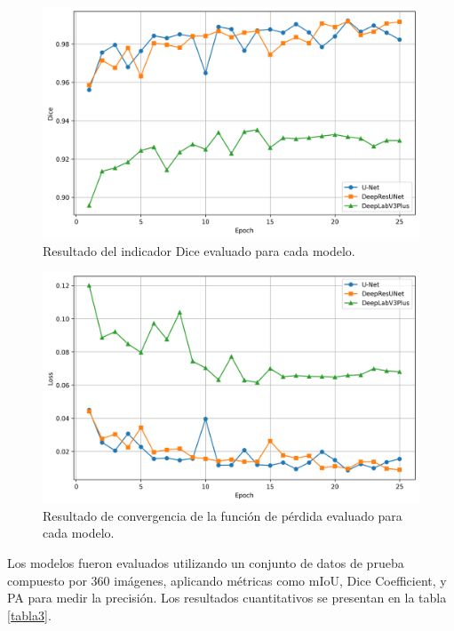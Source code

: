 \begin{figure}[h!]
	\centering
	\includegraphics[width=0.7\linewidth]{graficos/DICE_vs_epochs}
	\caption[Resultado del indicador Dice evaluado para cada modelo.]{Resultado del indicador Dice evaluado para cada modelo.
	}
	\label{fig:DICE_vs_epochs}
\end{figure}

\begin{figure}[h!]
	\centering
	\includegraphics[width=0.7\linewidth]{graficos/Loss_vs_epochs}
	\caption[Resultado de convergencia de la función de pérdida (Loss) evaluado para cada modelo.]{Resultado de convergencia de la función de pérdida evaluado para cada modelo.
	}
	\label{fig:Loss_vs_epochs}
\end{figure}

Los modelos fueron evaluados utilizando un conjunto de datos de prueba compuesto por 360 imágenes, aplicando métricas como mIoU, Dice Coefficient, y PA para medir la precisión. Los resultados cuantitativos se presentan en la tabla \ref{tabla3}.


